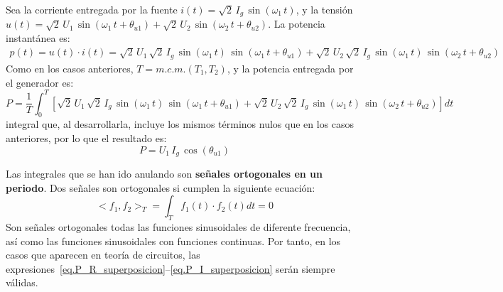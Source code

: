 Sea la corriente entregada por la fuente
$i(t)=\sqrt{2}\,I_g\,\sin(\omega_1\,t)$, y la tensión
$u(t)=\sqrt{2}\,U_{1}\,\sin(\omega_1\,t+\theta_{u1})+\sqrt{2}\,U_{2}\,\sin(\omega_2\,t+\theta_{u2})$. La
potencia instantánea es:
\begin{align*}
  p(t) = u(t)\cdot i(t) = \sqrt{2}\,U_{1}\, \sqrt{2}\,I_g\,\sin(\omega_1\,t)\,\sin(\omega_1\,t+\theta_{u1}) + \sqrt{2}\,U_{2}\, \sqrt{2}\,I_g\,\sin(\omega_1\,t)\,\sin(\omega_2\,t+\theta_{u2})
\end{align*} 
Como en los casos anteriores, $T=m.c.m.(T_1,T_2)$, y la potencia
entregada por el generador es:
\begin{equation*}
  P=\dfrac{1}{T}\int_0^T \left[\sqrt{2}\,U_{1}\, \sqrt{2}\,I_g\,\sin(\omega_1\,t)\,\sin(\omega_1\,t+\theta_{u1})+\sqrt{2}\,U_{2}\, \sqrt{2}\,I_g\,\sin(\omega_1\,t)\,\sin(\omega_2\,t+\theta_{u2}) \right] dt
\end{equation*}
integral que, al desarrollarla, incluye los mismos términos nulos que
en los casos anteriores, por lo que el resultado es:
\begin{equation}\label{eq.P_I_superposicion}
  \boxed{P=U_1\,I_g\,\cos(\theta_{u1})}
\end{equation}
    
\begin{remark}
  Las integrales que se han ido anulando son \textbf{señales
    ortogonales en un periodo}. Dos señales son ortogonales si cumplen
  la siguiente ecuación:
  \begin{equation*}
    <f_1, f_2>_T = \int_T f_1(t) \cdot f_2(t) dt = 0
  \end{equation*}
  Son señales ortogonales todas las funciones sinusoidales de
  diferente frecuencia, así como las funciones sinusoidales con
  funciones continuas. Por tanto, en los casos que aparecen en teoría
  de circuitos, las
  expresiones~\eqref{eq.P_R_superposicion}--\eqref{eq.P_I_superposicion}
  serán siempre válidas.
\end{remark}


